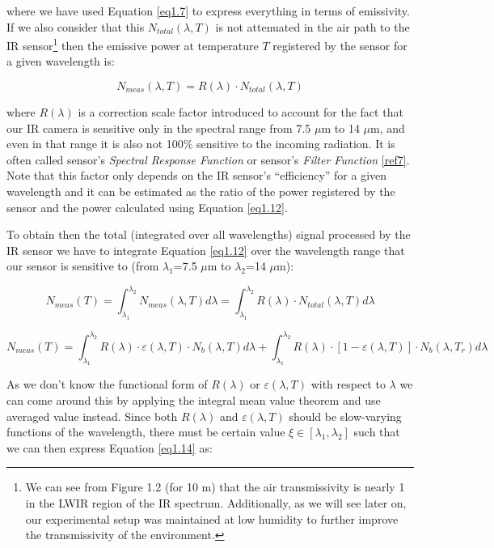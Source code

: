 		where we have used Equation \ref{eq1.7} to express everything in terms of emissivity. If we also consider that this $N_{total}(\lambda,T)$ is not attenuated in the air path to the IR sensor\footnote{{\footnotesize We can see from Figure 1.2 (for 10 m) that the air transmissivity is nearly 1 in the LWIR region of the IR spectrum. Additionally, as we will see later on, our experimental setup was maintained at low humidity to further improve the transmissivity of the environment.}} then the emissive power at temperature $T$ registered by the sensor for a given wavelength is:
		
		\begin{equation}\label{eq1.12}
			N_{meas}(\lambda,T)=R(\lambda) \cdot N_{total}(\lambda,T)
		\end{equation}\bigskip
		
		where $R(\lambda)$ is a correction scale factor introduced to account for the fact that our IR camera is sensitive only in the spectral range from 7.5 $\mu$m to 14 $\mu$m, and even in that range it is also not 100\% sensitive to the incoming radiation. It is often called sensor’s \textit{Spectral Response Function} or sensor’s \textit{Filter Function} \ref{ref7}. Note that this factor only depends on the IR sensor’s “efficiency” for a given wavelength and it can be estimated as the ratio of the power registered by the sensor and the power calculated using Equation \ref{eq1.12}.
		
		To obtain then the total (integrated over all wavelengths) signal processed by the IR sensor we have to integrate Equation \ref{eq1.12} over the wavelength range that our sensor is sensitive to (from $\lambda_{1}$=7.5 $\mu$m to $\lambda_{2}$=14 $\mu$m):
		
		\begin{equation}\label{eq1.13}
			N_{meas}(T)= \int_{\lambda_{1}}^{\lambda_{2}} N_{meas}(\lambda,T) d\lambda = \int_{\lambda_{1}}^{\lambda_{2}} R(\lambda) \cdot N_{total}(\lambda,T) d\lambda
		\end{equation}		
		
		\begin{equation}\label{eq1.14}
			N_{meas}(T)= \int_{\lambda_{1}}^{\lambda_{2}} R(\lambda) \cdot \varepsilon(\lambda,T) \cdot N_{b}(\lambda,T) d\lambda + \int_{\lambda_{1}}^{\lambda_{2}} R(\lambda) \cdot [1- \varepsilon(\lambda,T)] \cdot N_{b}(\lambda,T_{r}) d\lambda
		\end{equation}\bigskip	
		
		As we don’t know the functional form of $R(\lambda)$ or $\varepsilon(\lambda,T)$ with respect to $\lambda$ we can come around this by applying the integral mean value theorem and use averaged value instead. Since both $R(\lambda)$ and $\varepsilon(\lambda,T)$ should be slow-varying functions of the wavelength, there must be certain value $\xi \in [\lambda_{1},\lambda_{2}]$ such that we can then express Equation \ref{eq1.14} as:
		
